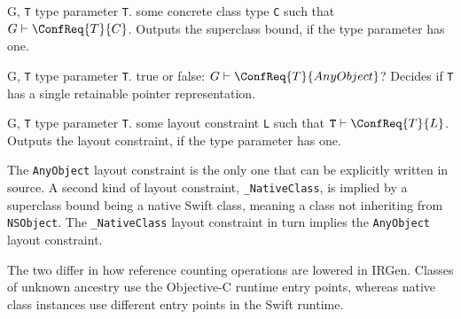 \documentclass[../generics]{subfiles}
\begin{document}
\begin{itemize}
{G, \texttt{T}}
{type parameter \texttt{T}.}
{some concrete class type \texttt{C} such that $G\vdash\ConfReq{T}{C}$.}
{Outputs the superclass bound, if the type parameter has one.}

{G, \texttt{T}}
{type parameter \texttt{T}.}
{true or false: $G\vdash\ConfReq{T}{AnyObject}$?}
{Decides if \texttt{T} has a single retainable pointer representation.}

{G, \texttt{T}}
{type parameter \texttt{T}.}
{some layout constraint \texttt{L} such that $\texttt{T}\vdash\ConfReq{T}{L}$.}
{Outputs the layout constraint, if the type parameter has one.}

The \texttt{AnyObject} layout constraint is the only one that can be explicitly written in source. A second kind of layout constraint, \texttt{\_NativeClass}, is implied by a superclass bound being a native Swift class, meaning a class not inheriting from \texttt{NSObject}. The \texttt{\_NativeClass} layout constraint in turn implies the \texttt{AnyObject} layout constraint.

The two differ in how reference counting operations are lowered in IRGen. Classes of unknown ancestry use the Objective-C runtime entry points, whereas native class instances use different entry points in the Swift runtime.
\end{itemize}
\end{document}
